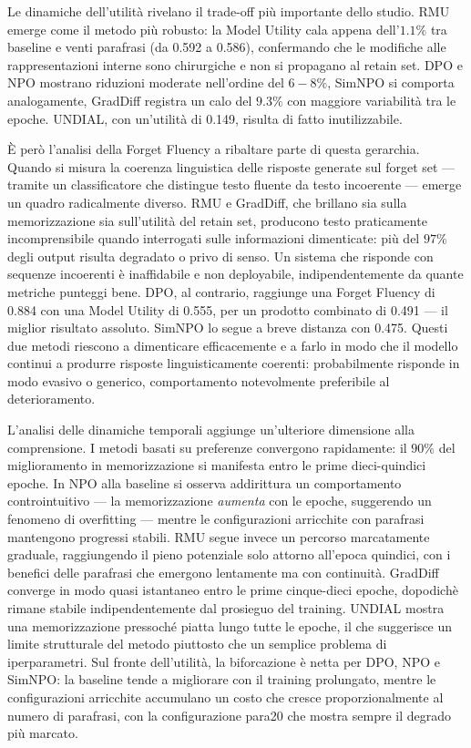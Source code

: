 \documentclass[12pt,a4paper]{article}
\begin{document}
Le dinamiche dell'utilità rivelano il trade-off più importante dello studio. RMU emerge come il metodo più robusto: la Model Utility cala appena dell'$1.1\%$ tra baseline e venti parafrasi (da 0.592 a 0.586), confermando che le modifiche alle rappresentazioni interne sono chirurgiche e non si propagano al retain set. DPO e NPO mostrano riduzioni moderate nell'ordine del $6-8\%$, SimNPO si comporta analogamente, GradDiff registra un calo del $9.3\%$ con maggiore variabilità tra le epoche. UNDIAL, con un'utilità di 0.149, risulta di fatto inutilizzabile.

È però l'analisi della Forget Fluency a ribaltare parte di questa gerarchia. Quando si misura la coerenza linguistica delle risposte generate sul forget set — tramite un classificatore che distingue testo fluente da testo incoerente — emerge un quadro radicalmente diverso. RMU e GradDiff, che brillano sia sulla memorizzazione sia sull'utilità del retain set, producono testo praticamente incomprensibile quando interrogati sulle informazioni dimenticate: più del $97\%$ degli output risulta degradato o privo di senso. Un sistema che risponde con sequenze incoerenti è inaffidabile e non deployabile, indipendentemente da quante metriche punteggi bene. DPO, al contrario, raggiunge una Forget Fluency di 0.884 con una Model Utility di 0.555, per un prodotto combinato di 0.491 — il miglior risultato assoluto. SimNPO lo segue a breve distanza con 0.475. Questi due metodi riescono a dimenticare efficacemente e a farlo in modo che il modello continui a produrre risposte linguisticamente coerenti: probabilmente risponde in modo evasivo o generico, comportamento notevolmente preferibile al deterioramento.

L'analisi delle dinamiche temporali aggiunge un'ulteriore dimensione alla comprensione. I metodi basati su preferenze convergono rapidamente: il $90\%$ del miglioramento in memorizzazione si manifesta entro le prime dieci-quindici epoche. In NPO alla baseline si osserva addirittura un comportamento controintuitivo — la memorizzazione \emph{aumenta} con le epoche, suggerendo un fenomeno di overfitting — mentre le configurazioni arricchite con parafrasi mantengono progressi stabili. RMU segue invece un percorso marcatamente graduale, raggiungendo il pieno potenziale solo attorno all'epoca quindici, con i benefici delle parafrasi che emergono lentamente ma con continuità. GradDiff converge in modo quasi istantaneo entro le prime cinque-dieci epoche, dopodichè rimane stabile indipendentemente dal prosieguo del training. UNDIAL mostra una memorizzazione pressoché piatta lungo tutte le epoche, il che suggerisce un limite strutturale del metodo piuttosto che un semplice problema di iperparametri. Sul fronte dell'utilità, la biforcazione è netta per DPO, NPO e SimNPO: la baseline tende a migliorare con il training prolungato, mentre le configurazioni arricchite accumulano un costo che cresce proporzionalmente al numero di parafrasi, con la configurazione para20 che mostra sempre il degrado più marcato.
\end{document}
